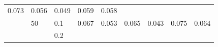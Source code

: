 \documentclass[12pt,oneside,a4paper]{reedthesis}
\begin{document}
\begin{longtable}[]{@{}lllllllll@{}}
\begin{minipage}[t]{0.08\columnwidth}
0.073\strut
\end{minipage} & \begin{minipage}[t]{0.08\columnwidth}\raggedright
0.056\strut
\end{minipage} & \begin{minipage}[t]{0.08\columnwidth}\raggedright
0.049\strut
\end{minipage} & \begin{minipage}[t]{0.08\columnwidth}\raggedright
0.059\strut
\end{minipage} & \begin{minipage}[t]{0.08\columnwidth}\raggedright
0.058\strut
\end{minipage}\tabularnewline
\begin{minipage}[t]{0.12\columnwidth}\raggedright
\strut
\end{minipage} & \begin{minipage}[t]{0.09\columnwidth}\raggedright
50\strut
\end{minipage} & \begin{minipage}[t]{0.06\columnwidth}\raggedright
0.1\strut
\end{minipage} & \begin{minipage}[t]{0.08\columnwidth}\raggedright
0.067\strut
\end{minipage} & \begin{minipage}[t]{0.08\columnwidth}\raggedright
0.053\strut
\end{minipage} & \begin{minipage}[t]{0.08\columnwidth}\raggedright
0.065\strut
\end{minipage} & \begin{minipage}[t]{0.08\columnwidth}\raggedright
0.043\strut
\end{minipage} & \begin{minipage}[t]{0.08\columnwidth}\raggedright
0.075\strut
\end{minipage} & \begin{minipage}[t]{0.08\columnwidth}\raggedright
0.064\strut
\end{minipage}\tabularnewline
\begin{minipage}[t]{0.12\columnwidth}\raggedright
\strut
\end{minipage} & \begin{minipage}[t]{0.09\columnwidth}\raggedright
\strut
\end{minipage} & \begin{minipage}[t]{0.06\columnwidth}\raggedright
0.2\strut
\end{minipage} & \begin{minipage}[t]{0.08\columnwidth}\raggedright

\end{minipage}
\end{longtable}
\end{document}
